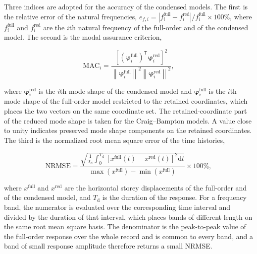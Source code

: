 \documentclass[a4paper,fleqn,review,12pt]{cas-sc}
\numberwithin{equation}{section}
\begin{document}
Three indices are adopted for the accuracy of the condensed models. The first is the relative error of the natural frequencies, \(e_{f,i}=|f_{i}^{\mathrm{full}}-f_{i}^{\mathrm{red}}|/f_{i}^{\mathrm{full}}\times100\%\), where \(f_{i}^{\mathrm{full}}\) and \(f_{i}^{\mathrm{red}}\) are the \(i\)th natural frequency of the full-order and of the condensed model. The second is the modal assurance criterion,

\vspace{-3.5em}
\begin{equation}
	\mathrm{MAC}_{i}=
	\frac{\left[\left(\bm{\varphi}_{i}^{\mathrm{full}}\right)^{\mathsf{T}}
		\bm{\varphi}_{i}^{\mathrm{red}}\right]^{2}}
	{\left\|\bm{\varphi}_{i}^{\mathrm{full}}\right\|^{2}
		\left\|\bm{\varphi}_{i}^{\mathrm{red}}\right\|^{2}},
	\label{eq:mac}
\end{equation}
\vspace{-3.5em}

\noindent where \(\bm{\varphi}_{i}^{\mathrm{red}}\) is the \(i\)th mode shape of the condensed model and \(\bm{\varphi}_{i}^{\mathrm{full}}\) is the \(i\)th mode shape of the full-order model restricted to the retained coordinates, which places the two vectors on the same coordinate set. The retained-coordinate part of the reduced mode shape is taken for the Craig--Bampton models. A value close to unity indicates preserved mode shape components on the retained coordinates. The third is the normalized root mean square error of the time histories,

\vspace{-3.5em}
\begin{equation}
	\mathrm{NRMSE}=
	\frac{\displaystyle\sqrt{\frac{1}{T_{\mathrm{d}}}\int_{0}^{T_{\mathrm{d}}}
			\left[x^{\mathrm{full}}(t)-x^{\mathrm{red}}(t)\right]^{2}\mathrm{d}t}}
	{\max\left(x^{\mathrm{full}}\right)-\min\left(x^{\mathrm{full}}\right)}
	\times100\%,
	\label{eq:nrmse}
\end{equation}
\vspace{-3.5em}

\noindent where \(x^{\mathrm{full}}\) and \(x^{\mathrm{red}}\) are the horizontal storey displacements of the full-order and of the condensed model, and \(T_{\mathrm{d}}\) is the duration of the response. For a frequency band, the numerator is evaluated over the corresponding time interval and divided by the duration of that interval, which places bands of different length on the same root mean square basis. The denominator is the peak-to-peak value of the full-order response over the whole record and is common to every band, and a band of small response amplitude therefore returns a small NRMSE.
\end{document}
